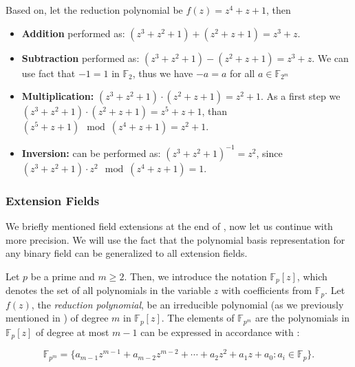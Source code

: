 \begin{example}
	\label{ex:ch01.arithmeticoperationsinf24}
	Based on\cite{menezes2004ECC}, let the reduction polynomial be $f(z) = z^4 + z + 1$, then
	\begin{itemize}
		\item \textbf{Addition} performed as:  $(z^3 + z^2 + 1) + (z^2 + z + 1) = z^3 + z$.
		\item \textbf{Subtraction}  performed as: $(z^3 + z^2 + 1) - (z^2 + z + 1) = z^3 + z$. We can use fact that $-1 = 1$ in $\mathbb{F}_2$, thus we have $-a = a$ for all $a \in \mathbb{F}_{2^m}$
		\item  \textbf{Multiplication:} $(z^3 + z^2 + 1) \cdot (z^2 + z + 1) = z^2 + 1$. As a first step we $(z^3 + z^2 + 1) \cdot (z^2 + z + 1) = z^5 + z + 1$, than $(z^5 + z + 1) \mod (z^4 + z + 1) = z^2 + 1$.
		\item \textbf{Inversion:} can be performed as: $(z^3 + z^2 + 1)^{-1} = z^2$, since $(z^3 + z^2 + 1) \cdot z^2 \mod (z^4 + z + 1) = 1$.
	\end{itemize}
\end{example}



\subsubsection{Extension Fields}
\label{sssec:ch01.extensionFields}

We briefly mentioned field extensions at the end of , now let us continue with more precision. We will use the fact that the polynomial basis representation for any binary field can be generalized to all extension fields. 

Let $p$ be a prime and $m \geq 2$. Then, we introduce the notation $\mathbb{F}_p[z]$, which denotes the set of all
polynomials in the variable $z$ with coefficients from $\mathbb{F}_p$. Let $f(z)$, the \textit{reduction polynomial},
be an irreducible polynomial (as we previously mentioned in ) of degree $m$ in $\mathbb{F}_p[z]$. The elements of $\mathbb{F}_{p^m}$ are the polynomials in $\mathbb{F}_p[z]$ of degree at most $m-1$ can be expressed in accordance with :

\begin{equation}
	\mathbb{F}_{p^m} = \{ a_{m-1}z^{m-1} + a_{m-2}z^{m-2} + \cdots + a_2 z^2 + a_1 z + a_0 : a_i \in \mathbb{F}_p \}.
	\label{eq:ch1.extensionFieldElements}
\end{equation}

